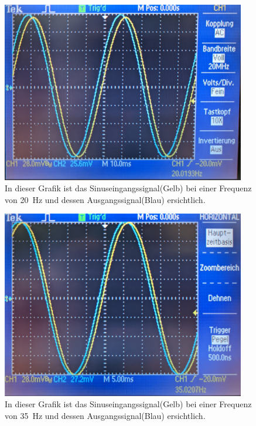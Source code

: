 \documentclass[12pt,english,ngerman]{scrartcl}
\begin{document}
\begin{figure}[H]
  \centering
    \includegraphics[width=0.95\textwidth]{./figures/integrator/20hz.jpg}
    \caption{In dieser Grafik ist das Sinuseingangssignal(Gelb) bei einer Frequenz von
    \SI{20}{\Hz} und dessen Ausgangssignal(Blau) ersichtlich.}
  \label{fig:mess_integrator_20hz}
\end{figure}

\begin{figure}[H]
  \centering
    \includegraphics[width=0.95\textwidth]{./figures/integrator/35hz.jpg}
    \caption{In dieser Grafik ist das Sinuseingangssignal(Gelb) bei einer Frequenz von
    \SI{35}{\Hz} und dessen Ausgangssignal(Blau) ersichtlich.}
  \label{fig:mess_integrator_35hz}
\end{figure}
\end{document}
